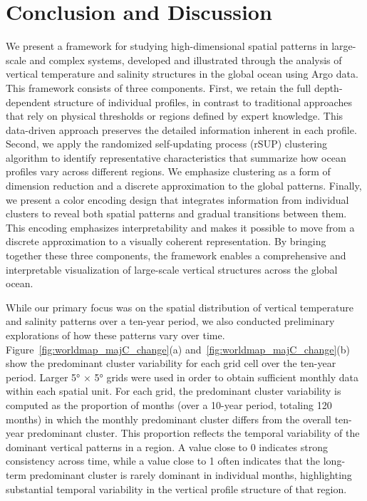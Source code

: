 \documentclass[11pt]{article}
\theoremstyle{plain}
\begin{document}
\newpage
\section{Conclusion and Discussion}
We present a framework for studying high-dimensional spatial patterns in large-scale and complex systems, developed and illustrated through the analysis of vertical temperature and salinity structures in the global ocean using Argo data. This framework consists of three components. First, we retain the full depth-dependent structure of individual profiles, in contrast to traditional approaches that rely on physical thresholds or regions defined by expert knowledge. This data-driven approach preserves the detailed information inherent in each profile. Second, we apply the randomized self-updating process (rSUP) clustering algorithm to identify representative characteristics that summarize how ocean profiles vary across different regions. We emphasize clustering as a form of dimension reduction and a discrete approximation to the global patterns. Finally, we present a color encoding design that integrates information from individual clusters to reveal both spatial patterns and gradual transitions between them. This encoding emphasizes interpretability and makes it possible to move from a discrete approximation to a visually coherent representation. By bringing together these three components, the framework enables a comprehensive and interpretable visualization of large-scale vertical structures across the global ocean.

While our primary focus was on the spatial distribution of vertical temperature and salinity patterns over a ten-year period, we also conducted preliminary explorations of how these patterns vary over time. Figure~\ref{fig:worldmap_majC_change}(a) and~\ref{fig:worldmap_majC_change}(b) show the predominant cluster variability for each grid cell over the ten-year period. Larger 5° × 5° grids were used in order to obtain sufficient monthly data within each spatial unit. For each grid, the predominant cluster variability is computed as the proportion of months (over a 10-year period, totaling 120 months) in which the monthly predominant cluster differs from the overall ten-year predominant cluster. This proportion reflects the temporal variability of the dominant vertical patterns in a region. A value close to 0 indicates strong consistency across time, while a value close to 1 often indicates that the long-term predominant cluster is rarely dominant in individual months, highlighting substantial temporal variability in the vertical profile structure of that region.
\end{document}
